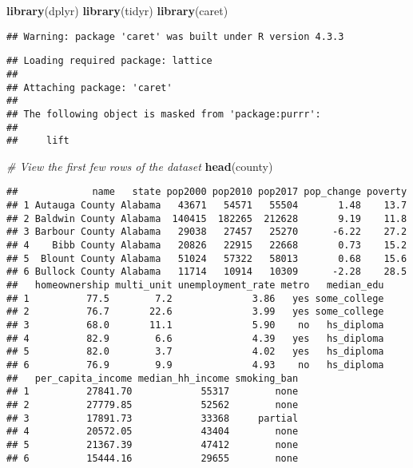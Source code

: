 \documentclass[
]{article}
\newenvironment{Shaded}{\begin{snugshade}}{\end{snugshade}}
\newcommand{\CommentTok}[1]{\textcolor[rgb]{0.56,0.35,0.01}{\textit{#1}}}
\newcommand{\FunctionTok}[1]{\textcolor[rgb]{0.13,0.29,0.53}{\textbf{#1}}}
\newcommand{\NormalTok}[1]{#1}
\begin{document}
\begin{Shaded}
\begin{Highlighting}[]
\FunctionTok{library}\NormalTok{(dplyr)}
\FunctionTok{library}\NormalTok{(tidyr)}
\FunctionTok{library}\NormalTok{(caret)}
\end{Highlighting}
\end{Shaded}

\begin{verbatim}
## Warning: package 'caret' was built under R version 4.3.3
\end{verbatim}

\begin{verbatim}
## Loading required package: lattice
## 
## Attaching package: 'caret'
## 
## The following object is masked from 'package:purrr':
## 
##     lift
\end{verbatim}

\begin{Shaded}
\begin{Highlighting}[]
\CommentTok{\# View the first few rows of the dataset}
\FunctionTok{head}\NormalTok{(county)}
\end{Highlighting}
\end{Shaded}

\begin{verbatim}
##             name   state pop2000 pop2010 pop2017 pop_change poverty
## 1 Autauga County Alabama   43671   54571   55504       1.48    13.7
## 2 Baldwin County Alabama  140415  182265  212628       9.19    11.8
## 3 Barbour County Alabama   29038   27457   25270      -6.22    27.2
## 4    Bibb County Alabama   20826   22915   22668       0.73    15.2
## 5  Blount County Alabama   51024   57322   58013       0.68    15.6
## 6 Bullock County Alabama   11714   10914   10309      -2.28    28.5
##   homeownership multi_unit unemployment_rate metro   median_edu
## 1          77.5        7.2              3.86   yes some_college
## 2          76.7       22.6              3.99   yes some_college
## 3          68.0       11.1              5.90    no   hs_diploma
## 4          82.9        6.6              4.39   yes   hs_diploma
## 5          82.0        3.7              4.02   yes   hs_diploma
## 6          76.9        9.9              4.93    no   hs_diploma
##   per_capita_income median_hh_income smoking_ban
## 1          27841.70            55317        none
## 2          27779.85            52562        none
## 3          17891.73            33368     partial
## 4          20572.05            43404        none
## 5          21367.39            47412        none
## 6          15444.16            29655        none
\end{verbatim}
\end{document}
